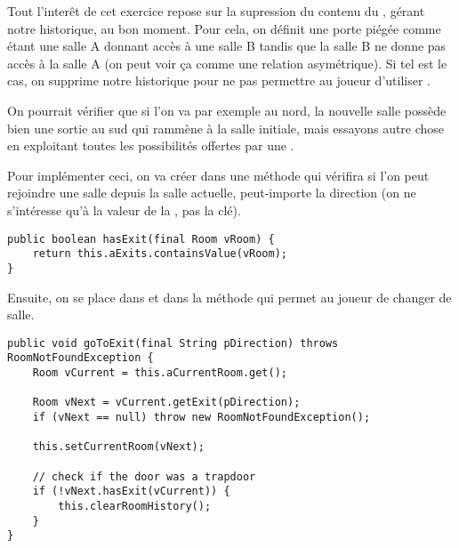 \begin{exercise}[subtitle=Trap Door]

Tout l'interêt de cet exercice repose sur la supression du contenu du , gérant notre historique, au bon moment. Pour cela, on définit une porte piégée comme étant une salle A donnant accès à une salle B tandis que la salle B ne donne pas accès à la salle A (on peut voir ça comme une relation asymétrique). Si tel est le cas, on supprime notre historique pour ne pas permettre au joueur d'utiliser .

On pourrait vérifier que si l'on va par exemple au nord, la nouvelle salle possède bien une sortie au sud qui rammène à la salle initiale, mais essayons autre chose en exploitant toutes les possibilités offertes par une .

Pour implémenter ceci, on va créer dans  une méthode  qui vérifira si l'on peut rejoindre une salle depuis la salle actuelle, peut-importe la direction (on ne s'intéresse qu'à la valeur de la , pas la clé).

\begin{verbatim}
public boolean hasExit(final Room vRoom) {
    return this.aExits.containsValue(vRoom);
}
\end{verbatim}

Ensuite, on se place dans  et dans la méthode  qui permet au joueur de changer de salle.

\begin{verbatim}
public void goToExit(final String pDirection) throws RoomNotFoundException {
    Room vCurrent = this.aCurrentRoom.get();

    Room vNext = vCurrent.getExit(pDirection);
    if (vNext == null) throw new RoomNotFoundException();

    this.setCurrentRoom(vNext);

    // check if the door was a trapdoor
    if (!vNext.hasExit(vCurrent)) {
        this.clearRoomHistory();
    }
}
\end{verbatim}
\end{exercise}

